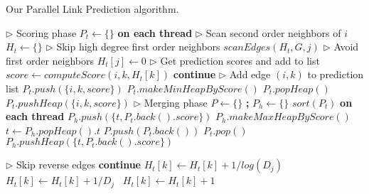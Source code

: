 \begin{algorithm}[hbtp]
\caption{Our Parallel Link Prediction algorithm.}
\label{alg:predict}
\begin{algorithmic}[1]

\Statex

 \label{alg:predict--begin}
  \State $\rhd$ Scoring phase
  \State $P_t \gets \{\}$ \textbf{on each thread} \label{alg:predict--scoring-begin}
    \State $\rhd$ Scan second order neighbors of $i$
    \State $H_t \gets \{\}$
      \State $\rhd$ Skip high degree first order neighbors
       $scanEdges(H_t, G, j)$
      \EndIf
    \EndFor
    \State $\rhd$ Avoid first order neighbors
     $H_t[j] \gets 0$ \label{alg:predict--avoid-neighbors1}
    \EndFor
    \State $\rhd$ Get prediction scores and add to list
      \State $score \gets computeScore(i, k, H_t[k])$
       \textbf{continue}
      \EndIf
      \State $\rhd$ Add edge $(i, k)$ to prediction list
        \State $P_t.push(\{i, k, score\})$
         $P_t.makeMinHeapByScore()$
        \EndIf
        \State $P_t.popHeap()$
        \State $P_t.pushHeap(\{i, k, score\})$
      \EndIf
    \EndFor
  \EndFor \label{alg:predict--scoring-end}
  \State $\rhd$ Merging phase \label{alg:predict--merging-begin}
  \State $P \gets \{\}$ \textbf{;} $P_h \gets \{\}$
  \State $sort(P_t)$ \textbf{on each thread}
     $P_h.push(\{t, P_t.back().score\})$
    \EndIf
  \EndFor
  \State $P_h.makeMaxHeapByScore()$ 
   \label{alg:predict--merge-loop-begin}
    \State $t \gets P_h.popHeap().t$
    \State $P.push(P_t.back())$
    \State $P_t.pop()$
     $P_h.pushHeap(\{t, P_t.back().score\})$
    \EndIf
  \EndWhile \label{alg:predict--merging-end}
\EndFunction \label{alg:predict--end}

\Statex

 \label{alg:predict--scan-begin}
    \State $\rhd$ Skip reverse edges
     \textbf{continue}
    \EndIf
     $H_t[k] \gets H_t[k] + 1 / log(D_j)$
     $H_t[k] \gets H_t[k] + 1 / D_j$
    \Else\ $H_t[k] \gets H_t[k] + 1$
    \EndIf
  \EndFor
\EndFunction \label{alg:predict--scan-end}
\end{algorithmic}
\end{algorithm}
